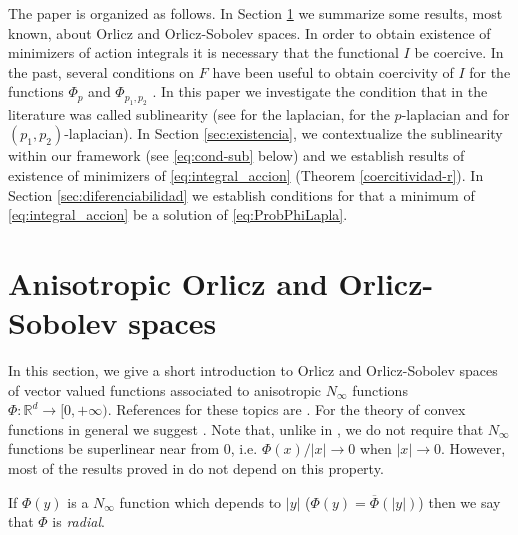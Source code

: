 \documentclass[twoside]{article}
\theoremstyle{remark}
\newcommand{\rr}{\mathbb{R}}
\begin{document}
The paper is organized as follows. In Section \ref{sec:preliminares}  we summarize some results, most known, about Orlicz and Orlicz-Sobolev spaces. In order to obtain existence of minimizers of action integrals it is necessary that the functional $I$ be coercive. 
In the past, several conditions on $F$ have been useful to obtain coercivity of $I$ for the functions  $\Phi_p$ and $\Phi_{p_1,p_2}$ . 
In this paper  we investigate the condition that in the literature was called sublinearity 
(see \cite{tang1998periodic,wu1999periodic,zhao2004periodic} for the laplacian, \cite{li2015infinitely,tang2010periodic} for the $p$-laplacian and \cite{li2014periodic,pasca2010periodic,pacsca2010some,yang2013existence} for $(p_1,p_2)$-laplacian). In Section \ref{sec:existencia},  we contextualize the sublinearity within our framework (see \eqref{eq:cond-sub} below) and we  establish results of existence of minimizers of \eqref{eq:integral_accion} (Theorem \ref{coercitividad-r}).   In  Section \ref{sec:diferenciabilidad}  we establish conditions for that a minimum of \eqref{eq:integral_accion}  be a solution of \eqref{eq:ProbPhiLapla}.

   










\section{Anisotropic Orlicz and Orlicz-Sobolev spaces}\label{sec:preliminares}

In this section, we give a short introduction to  Orlicz and Orlicz-Sobolev spaces of vector valued functions associated to anisotropic $N_{\infty}$ functions $\Phi:\rr^d\to[0,+\infty)$.  References for  these topics are \cite{chamra2017anisotropic,cianchi2000fully,cianchi2004optimal,Desch2001,gwiazda2013anisotropic,Orliczvectorial2005,Skaff1969,trudinger1974imbedding}. For the theory of convex functions in general we suggest \cite{clarke2013functional}. 
Note that, unlike in \cite{gwiazda2013anisotropic}, we do not require that $N_{\infty}$ functions be superlinear near from 0, i.e. $\Phi(x)/|x|\to 0$ when $|x|\to 0$. However, most of the results proved in \cite{gwiazda2013anisotropic} do not depend on this property. 

If $\Phi(y)$ is a $N_{\infty}$  function which depends to $|y|$ ($\Phi(y)=\overline{\Phi}(|y|)$) then we say that $\Phi$ is \emph{radial}. 
\end{document}
